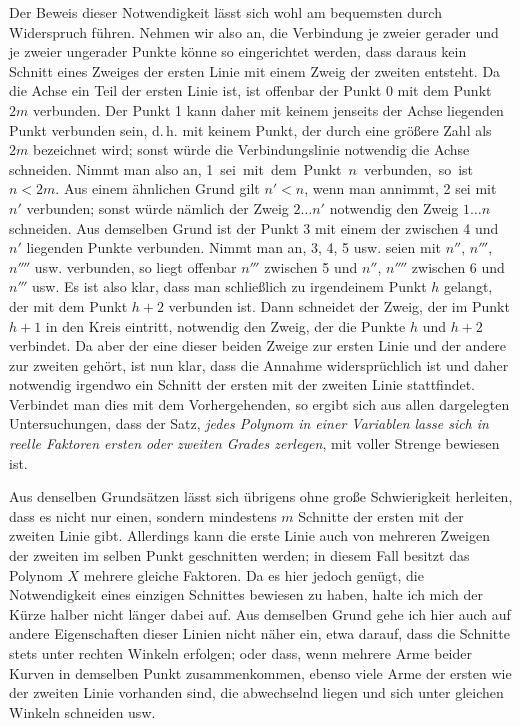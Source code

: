  Der Beweis dieser Notwendigkeit lässt sich wohl am bequemsten durch Widerspruch führen. Nehmen wir also an, die Verbindung je zweier gerader und je zweier ungerader Punkte könne so eingerichtet werden, dass daraus kein Schnitt eines Zweiges der ersten Linie mit einem Zweig der zweiten entsteht. Da die Achse ein Teil der ersten Linie ist, ist offenbar der Punkt 0 mit dem Punkt $2m$ verbunden. Der Punkt 1 kann daher mit keinem jenseits der Achse liegenden Punkt verbunden sein, d.\,h. mit keinem Punkt, der durch eine größere Zahl als $2m$ bezeichnet wird; sonst würde die Verbindungslinie notwendig die Achse schneiden. Nimmt man also an, \mbox{1 sei mit dem Punkt $n$ verbunden, so ist $n<2m$}. Aus einem ähnlichen Grund gilt $n'<n$, wenn man annimmt, 2 sei mit $n'$ verbunden; sonst würde nämlich der Zweig $2\ldots n'$ notwendig den Zweig $1\ldots n$ schneiden. Aus demselben Grund ist der Punkt 3 mit einem der zwischen 4 und $n'$ liegenden Punkte verbunden. Nimmt man an, 3, 4, 5 usw. seien mit $n''$, $n'''$, $n''''$ usw. verbunden, so liegt offenbar $n'''$ zwischen 5 und $n''$, $n''''$ zwischen 6 und $n'''$ usw. Es ist also klar, dass man schließlich zu irgendeinem Punkt $h$ gelangt, der mit dem Punkt $h+2$ verbunden ist. Dann schneidet der Zweig, der im Punkt $h+1$ in den Kreis eintritt, notwendig den Zweig, der die Punkte $h$ und $h+2$ verbindet. Da aber der eine dieser beiden Zweige zur ersten Linie und der andere zur zweiten gehört, ist nun klar, dass die Annahme widersprüchlich ist und daher notwendig irgendwo ein Schnitt der ersten mit der zweiten Linie stattfindet.
Verbindet man dies mit dem Vorhergehenden, so ergibt sich aus allen dargelegten Untersuchungen, dass der Satz, \textit{jedes Polynom in einer Variablen lasse sich in reelle Faktoren ersten oder zweiten Grades zerlegen}, mit voller Strenge bewiesen ist.

 Aus denselben Grundsätzen lässt sich übrigens ohne große Schwierigkeit herleiten, dass es nicht nur einen, sondern mindestens $m$ Schnitte der ersten mit der zweiten Linie gibt. Allerdings kann die erste Linie auch von mehreren Zweigen der zweiten im selben Punkt geschnitten werden; in diesem Fall besitzt das Polynom $X$ mehrere gleiche Faktoren. Da es hier jedoch genügt, die Notwendigkeit eines einzigen Schnittes bewiesen zu haben, halte ich mich der Kürze halber nicht länger dabei auf. Aus demselben Grund gehe ich hier auch auf andere Eigenschaften dieser Linien nicht näher ein, etwa darauf, dass die Schnitte stets unter rechten Winkeln erfolgen; oder dass, wenn mehrere Arme beider Kurven in demselben Punkt zusammenkommen, ebenso viele Arme der ersten wie der zweiten Linie vorhanden sind, die abwechselnd liegen und sich unter gleichen Winkeln schneiden usw.

